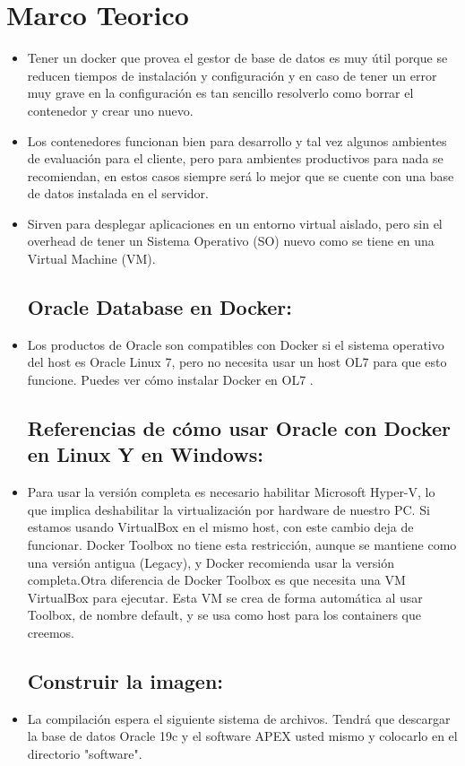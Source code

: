 \section{Marco Teorico} 

\begin{itemize}
\subsection{ Docker:}
	\item Tener un docker que provea el gestor de base de datos es muy útil porque se reducen tiempos de instalación y configuración y en caso de tener un error muy grave en la configuración es tan sencillo resolverlo como borrar el contenedor y crear uno nuevo.
          \item Los contenedores funcionan bien para desarrollo y tal vez algunos ambientes de evaluación para el cliente, pero para ambientes productivos para nada se recomiendan, en estos casos siempre será lo mejor que se cuente con una base de datos instalada en el servidor.
         \item Sirven para desplegar aplicaciones en un entorno virtual aislado, pero sin el overhead de tener un Sistema Operativo (SO) nuevo como se tiene en una Virtual Machine (VM).

\subsection{Oracle Database en Docker:}
	\item Los productos de Oracle son compatibles con Docker si el sistema operativo del host es Oracle Linux 7, pero no necesita usar un host OL7 para que esto funcione. Puedes ver cómo instalar Docker en OL7 .



\subsection{Referencias de cómo usar Oracle con Docker en Linux Y  en Windows:}

	\item Para usar la versión completa es necesario habilitar Microsoft Hyper-V, lo que implica deshabilitar la virtualización por hardware de nuestro PC. Si estamos usando VirtualBox en el mismo host, con este cambio deja de funcionar.
Docker Toolbox no tiene esta restricción, aunque se mantiene como una versión antigua (Legacy), y Docker recomienda usar la versión completa.Otra diferencia de Docker Toolbox es que necesita una VM VirtualBox para ejecutar. Esta VM se crea de forma automática al usar Toolbox, de nombre default, y se usa como host para los containers que creemos.
 \subsection{Construir la imagen:}
	\item La compilación espera el siguiente sistema de archivos. Tendrá que descargar la base de datos Oracle 19c y el software APEX usted mismo y colocarlo en el directorio "software".
                  


\end{itemize}







